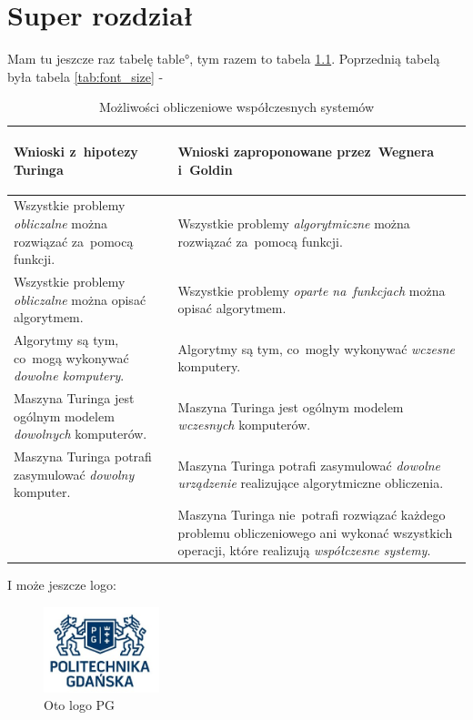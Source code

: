 \chapter{Super rozdział}
\label{chap:super}

Mam tu jeszcze raz tabelę \ang{table}, tym razem to tabela \ref{tab:interakcja}. Poprzednią tabelą była tabela \ref{tab:font_size} - 

\begin{table}[!ht]

\caption{Możliwości obliczeniowe współczesnych systemów}
\label{tab:interakcja}
\small
\begin{tabular}{|p{}|p{}|}
\hline

\begin{center}
\textbf{Wnioski z~hipotezy Turinga}
\end{center}
 & 
\begin{center}
\textbf{Wnioski zaproponowane przez~Wegnera i~Goldin}
\end{center}

\\\hline 

  Wszystkie problemy \emph{obliczalne} można rozwiązać za~pomocą funkcji. &  Wszystkie problemy \emph{algorytmiczne} można rozwiązać za~pomocą funkcji. \\\hline
	Wszystkie problemy \emph{obliczalne} można opisać algorytmem. &  Wszystkie problemy \emph{oparte na~funkcjach} można opisać algorytmem.\\\hline
	Algorytmy są tym, co~mogą wykonywać \emph{dowolne komputery}. & Algorytmy są tym, co~mogły wykonywać \emph{wczesne} komputery. \\\hline
	Maszyna Turinga jest ogólnym modelem \emph{dowolnych} komputerów.  &  Maszyna Turinga jest ogólnym modelem \emph{wczesnych} komputerów.\\\hline
	Maszyna Turinga potrafi zasymulować \emph{dowolny} komputer.  &  Maszyna Turinga potrafi zasymulować \emph{dowolne urządzenie} realizujące algorytmiczne obliczenia.\\\hline
	
	\begin{center}
	\Large{\sffamily{:(}}
	\end{center}
			 &  Maszyna Turinga nie~potrafi rozwiązać każdego problemu obliczeniowego ani wykonać wszystkich operacji, które realizują \emph{współczesne systemy}.\\\hline


\end{tabular}
\end{table}


I może jeszcze logo:

\begin{figure}[!ht]
	\centering
		\includegraphics[width=0.3\textwidth]{Images/logo_pg.jpg}
	\caption{Oto logo PG}
	\label{fig:PD}
\end{figure}


